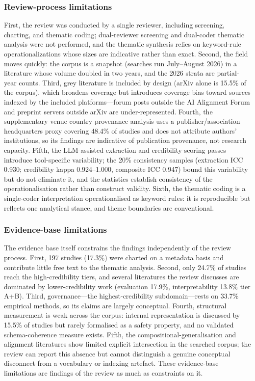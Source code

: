 \subsubsection{Review-process limitations}
First, the review was conducted by a single reviewer, including screening, charting, and thematic coding; dual-reviewer screening and dual-coder thematic analysis were not performed, and the thematic synthesis relies on keyword-rule operationalizations whose sizes are indicative rather than exact. Second, the field moves quickly: the corpus is a snapshot (searches run July--August 2026) in a literature whose volume doubled in two years, and the 2026 strata are partial-year counts. Third, grey literature is included by design (arXiv alone is 15.5\% of the corpus), which broadens coverage but introduces coverage bias toward sources indexed by the included platforms---forum posts outside the AI Alignment Forum and preprint servers outside arXiv are under-represented. Fourth, the supplementary venue-country provenance analysis uses a publisher/association-headquarters proxy covering 48.4\% of studies and does not attribute authors' institutions, so its findings are indicative of publication provenance, not research capacity. Fifth, the LLM-assisted extraction and credibility-scoring passes introduce tool-specific variability; the 20\% consistency samples (extraction ICC 0.930; credibility kappa 0.924--1.000, composite ICC 0.947) bound this variability but do not eliminate it, and the statistics establish consistency of the operationalisation rather than construct validity. Sixth, the thematic coding is a single-coder interpretation operationalised as keyword rules: it is reproducible but reflects one analytical stance, and theme boundaries are conventional.

\subsubsection{Evidence-base limitations}
The evidence base itself constrains the findings independently of the review process. First, 197 studies (17.3\%) were charted on a metadata basis and contribute little free text to the thematic analysis. Second, only 24.7\% of studies reach the high-credibility tiers, and several literatures the review discusses are dominated by lower-credibility work (evaluation 17.9\%, interpretability 13.8\% tier A+B). Third, governance---the highest-credibility subdomain---rests on 33.7\% empirical methods, so its claims are largely conceptual. Fourth, structural measurement is weak across the corpus: internal representation is discussed by 15.5\% of studies but rarely formalised as a safety property, and no validated schema-coherence measure exists. Fifth, the compositional-generalisation and alignment literatures show limited explicit intersection in the searched corpus; the review can report this absence but cannot distinguish a genuine conceptual disconnect from a vocabulary or indexing artefact. These evidence-base limitations are findings of the review as much as constraints on it.

